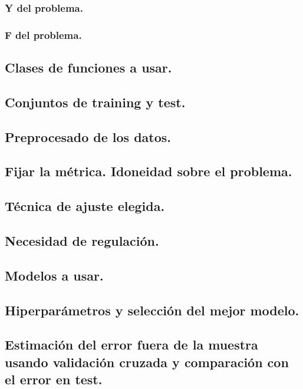 \documentclass[12pt, spanish]{article}
\begin{document}
\subsubsection{Y del problema.}

\subsubsection{F del problema.}

\subsection{Clases de funciones a usar.}

\subsection{Conjuntos de training y test.}

\subsection{Preprocesado de los datos.}

\subsection{Fijar la métrica. Idoneidad sobre el problema.}

\subsection{Técnica de ajuste elegida.}

\subsection{Necesidad de regulación.}

\subsection{Modelos a usar.}

\subsection{Hiperparámetros y selección del mejor modelo.}

\subsection{Estimación del error fuera de la muestra usando validación cruzada y comparación con el error en test.}
\end{document}
